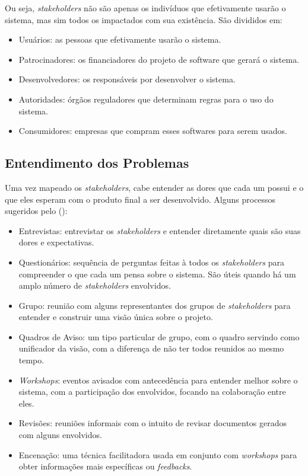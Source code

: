 Ou seja, \textit{stakeholders} não são apenas os indivíduos que efetivamente usarão o sistema, mas sim todos os impactados com sua existência. São divididos em:

\begin{itemize}
    \item Usuários: as pessoas que efetivamente usarão o sistema.
    \item Patrocinadores: os financiadores do projeto de software que gerará o sistema.
    \item Desenvolvedores: os responsáveis por desenvolver o sistema.
    \item Autoridades: órgãos reguladores que determinam regras para o uso do sistema.
    \item Consumidores: empresas que compram esses softwares para serem usados.
\end{itemize}

\subsection{Entendimento dos Problemas}
Uma vez mapeado os \textit{stakeholders}, cabe entender as dores que cada um possui e o que eles esperam com o produto final a ser desenvolvido. Alguns processos sugeridos pelo  (\citeyear{kurtbittnerianspence2002}):

\begin{itemize}
    \item Entrevistas: entrevistar os \textit{stakeholders} e entender diretamente quais são suas dores e expectativas.
    \item Questionários: sequência de perguntas feitas à todos os \textit{stakeholders} para compreender o que cada um pensa sobre o sistema. São úteis quando há um amplo número de \textit{stakeholders} envolvidos.
    \item Grupo: reunião com alguns representantes dos grupos de \textit{stakeholders} para entender e construir uma visão única sobre o projeto.
    \item Quadros de Aviso: um tipo particular de grupo, com o quadro servindo como unificador da visão, com a diferença de não ter todos reunidos ao mesmo tempo.
    \item \textit{Workshops}: eventos avisados com antecedência para entender melhor sobre o sistema, com a participação dos envolvidos, focando na colaboração entre eles.
    \item Revisões: reuniões informais com o intuito de revisar documentos gerados com alguns envolvidos.
    \item Encenação: uma técnica facilitadora usada em conjunto com \textit{workshops} para obter informações mais específicas ou \textit{feedbacks}.
\end{itemize}

